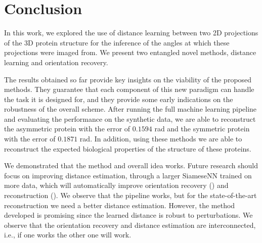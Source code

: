 \section{Conclusion}

 In this work, we explored the use of distance learning between two 2D projections of the 3D protein structure for the inference of the angles at which these projections were imaged from.
We present two entangled novel methods, distance learning and orientation recovery.

The results obtained so far provide key insights on the viability of the proposed methods.
They guarantee that each component of this new paradigm can handle the task it is designed for, and they provide some early indications on the robustness of the overall scheme.
After running the full machine learning pipeline and evaluating the performance on the synthetic data, we are able to reconstruct the asymmetric protein with the error of $0.1594$ rad and the symmetric protein with the error of $0.1871$ rad.
In addition, using these methods we are able to reconstruct the expected biological properties of the structure of these proteins.

We demonstrated that the method and overall idea works. Future research should focus on improving distance estimation, through a larger SiameseNN trained on more data, which will automatically improve orientation recovery () and reconstruction ().
We observe that the pipeline works, but for the state-of-the-art reconstruction we need a better distance estimation.
However, the method developed is promising since the learned distance is robust to perturbations.
We observe that the orientation recovery and distance estimation are interconnected, i.e., if one works the other one will work.


